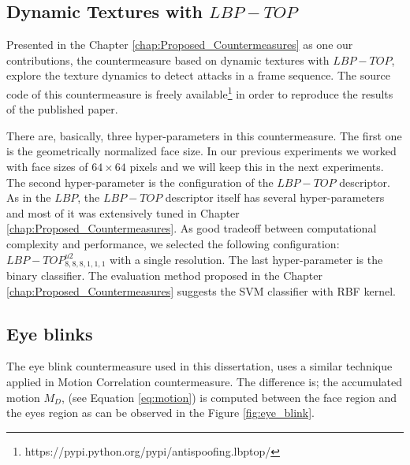 \subsection{Dynamic Textures with $LBP-TOP$}

Presented in the Chapter \ref{chap:Proposed_Countermeasures} as one our contributions, the countermeasure based on dynamic textures with $LBP-TOP$, explore the texture dynamics to detect attacks in a frame sequence. The source code of this countermeasure is freely available\footnote{https://pypi.python.org/pypi/antispoofing.lbptop/} in order to reproduce the results of the published paper.

There are, basically, three hyper-parameters in this countermeasure. The first one is the geometrically normalized face size. In our previous experiments we worked with face sizes of $64 \times 64$ pixels and we will keep this in the next experiments. The second hyper-parameter is the configuration of the $LBP-TOP$ descriptor. As in the $LBP$, the $LBP-TOP$ descriptor itself has several hyper-parameters and most of it was extensively tuned in Chapter \ref{chap:Proposed_Countermeasures}. As good tradeoff between computational complexity and performance, we selected the following configuration: $LBP-TOP^{u2}_{8,8,8,1,1,1}$ with a single resolution. The last hyper-parameter is the binary classifier. The evaluation method proposed in the Chapter \ref{chap:Proposed_Countermeasures} suggests the SVM classifier with RBF kernel.


\subsection{Eye blinks}

The eye blink countermeasure used in this dissertation, uses a similar technique applied in Motion Correlation countermeasure\cite{AnjosIJCB2011}. The difference is; the accumulated motion $M_D$, (see Equation \ref{eq:motion}) is computed between the face region and the eyes region as can be observed in the Figure \ref{fig:eye_blink}. 

